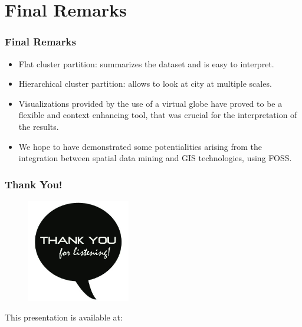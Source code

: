 \documentclass[hyperref={pdfpagelabels=true}]{beamer}
\begin{document}
\section{Final Remarks}
\begin{frame}
\frametitle{Final Remarks}
    \begin{itemize}    
      \item<2->Flat cluster partition: summarizes the dataset and is easy to interpret.
      \item<3->Hierarchical cluster partition: allows to look at city at multiple scales.%
      \item<4->Visualizations provided by the use of a virtual globe have proved to be a flexible and context enhancing tool, that was crucial for the interpretation of the results.
      \item<5->We hope to have demonstrated some potentialities arising from the integration between spatial data mining and GIS technologies, using FOSS.   
     \end{itemize}
\end{frame}

\begin{frame}
\frametitle{Thank You!}
    \begin{figure}   
      \includegraphics[width=0.4\textwidth]{thanks.jpg}      
    \end{figure}   
    This presentation is available at: 
      \vspace{5mm}    
\end{frame}
\end{document}
